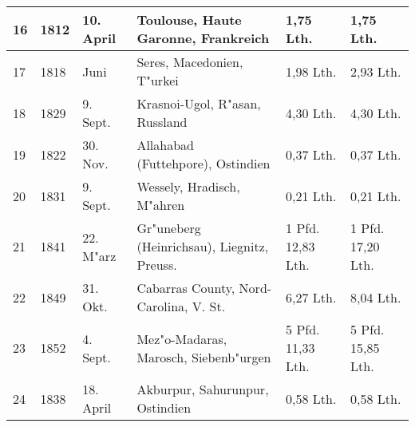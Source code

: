 \documentclass[a4paper, 11pt, oneside]{article}
\begin{document}
\begin{center}
\begin{footnotesize}
\begin{tabular}{ |p{7mm}|p{7mm}|p{13mm}|p{48mm}|p{22mm}|p{22mm}| }
    16 & 1812 & 10. April & Toulouse, Haute Garonne, Frankreich & 1,75 Lth. & 1,75 Lth.\\\hline
    17 & 1818 & Juni & Seres, Macedonien, T"urkei & 1,98 Lth. & 2,93 Lth.\\\hline
    18 & 1829 & 9. Sept. & Krasnoi-Ugol, R"asan, Russland & 4,30 Lth. & 4,30 Lth.\\\hline
    19 & 1822 & 30. Nov. & Allahabad (Futtehpore), Ostindien & 0,37 Lth. & 0,37 Lth.\\\hline
    20 & 1831 & 9. Sept. & Wessely, Hradisch, M"ahren & 0,21 Lth. & 0,21 Lth.\\\hline
    21 & 1841 & 22. M"arz & Gr"uneberg (Heinrichsau), Liegnitz, Preuss. & 1 Pfd. 12,83 Lth. & 1 Pfd. 17,20 Lth.\\\hline
    22 & 1849 & 31. Okt. & Cabarras County, Nord-Carolina, V. St. & 6,27 Lth. & 8,04 Lth.\\\hline
    23 & 1852 & 4. Sept. & Mez"o-Madaras, Marosch, Siebenb"urgen & 5 Pfd. 11,33 Lth. & 5 Pfd. 15,85 Lth.\\\hline
    24 & 1838 & 18. April & Akburpur, Sahurunpur, Ostindien & 0,58 Lth. & 0,58 Lth.\\
    \hline
\end{tabular}
\end{footnotesize}
\end{center}
\end{document}

